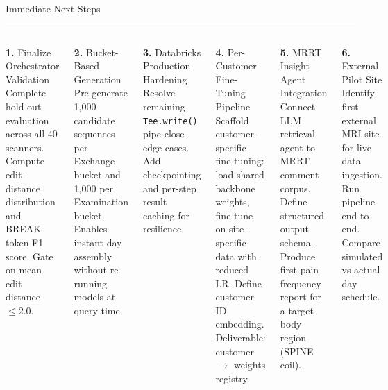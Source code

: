 \documentclass[aspectratio=169,12pt]{beamer}
\newcommand{\tealsep}{\vspace{1pt}\textcolor{SiemensTeal}{\rule{\linewidth}{1pt}}\vspace{4pt}}
\begin{document}
\begin{frame}[shrink=12]{Immediate Next Steps}
\tealsep
\vspace{4pt}

\begin{columns}[T]
\begin{block}{\textbf{1.} Finalize Orchestrator Validation}
  Complete hold-out evaluation across all 40 scanners. Compute edit-distance distribution and BREAK token F1 score. Gate on mean edit distance $\leq 2.0$.
\end{block}
\vspace{6pt}
\begin{block}{\textbf{2.} Bucket-Based Generation}
  Pre-generate 1{,}000 candidate sequences per Exchange bucket and 1{,}000 per Examination bucket. Enables instant day assembly without re-running models at query time.
\end{block}
\vspace{6pt}
\begin{block}{\textbf{3.} Databricks Production Hardening}
  Resolve remaining \texttt{Tee.write()} pipe-close edge cases. Add checkpointing and per-step result caching for resilience.
\end{block}

\begin{exampleblock}{\textbf{4.} Per-Customer Fine-Tuning Pipeline}
  Scaffold customer-specific fine-tuning: load shared backbone weights, fine-tune on site-specific data with reduced LR. Define customer ID embedding. Deliverable: customer $\to$ weights registry.
\end{exampleblock}
\vspace{6pt}
\begin{exampleblock}{\textbf{5.} MRRT Insight Agent Integration}
  Connect LLM retrieval agent to MRRT comment corpus. Define structured output schema. Produce first pain frequency report for a target body region (SPINE coil).
\end{exampleblock}
\vspace{6pt}
\begin{alertblock}{\textbf{6.} External Pilot Site}
  Identify first external MRI site for live data ingestion. Run pipeline end-to-end. Compare simulated vs actual day schedule.
\end{alertblock}
\end{columns}
\end{frame}
\end{document}
